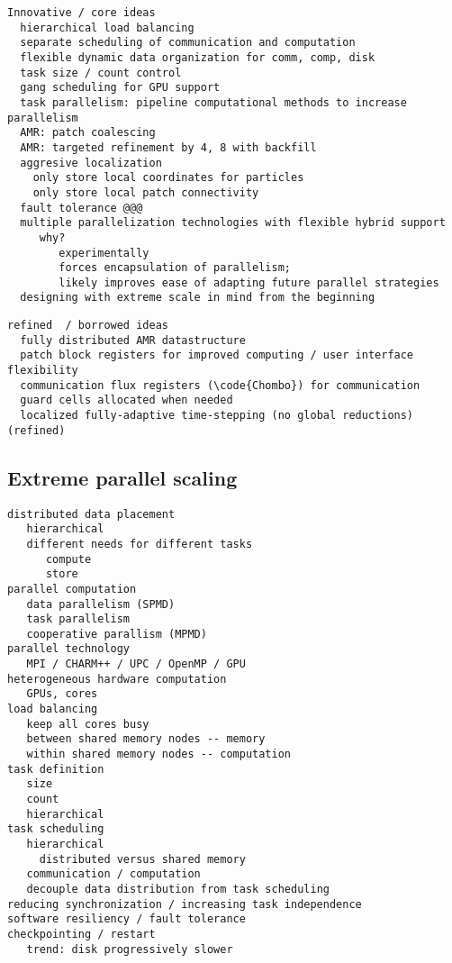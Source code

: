 \documentclass[14pt,letter]{article}
\begin{document}
\begin{verbatim}
Innovative / core ideas
  hierarchical load balancing
  separate scheduling of communication and computation
  flexible dynamic data organization for comm, comp, disk
  task size / count control
  gang scheduling for GPU support
  task parallelism: pipeline computational methods to increase parallelism
  AMR: patch coalescing
  AMR: targeted refinement by 4, 8 with backfill
  aggresive localization
    only store local coordinates for particles
    only store local patch connectivity
  fault tolerance @@@
  multiple parallelization technologies with flexible hybrid support
     why?  
        experimentally 
        forces encapsulation of parallelism; 
        likely improves ease of adapting future parallel strategies
  designing with extreme scale in mind from the beginning
\end{verbatim}

\begin{verbatim}
refined  / borrowed ideas
  fully distributed AMR datastructure
  patch block registers for improved computing / user interface flexibility
  communication flux registers (\code{Chombo}) for communication
  guard cells allocated when needed
  localized fully-adaptive time-stepping (no global reductions) (refined)
\end{verbatim}




\subsection{Extreme parallel scaling} \label{ss:parallel-scaling}

\begin{verbatim}
distributed data placement
   hierarchical
   different needs for different tasks
      compute
      store
parallel computation
   data parallelism (SPMD)
   task parallelism
   cooperative parallism (MPMD)
parallel technology
   MPI / CHARM++ / UPC / OpenMP / GPU
heterogeneous hardware computation
   GPUs, cores
load balancing
   keep all cores busy
   between shared memory nodes -- memory
   within shared memory nodes -- computation
task definition
   size
   count
   hierarchical
task scheduling
   hierarchical
     distributed versus shared memory
   communication / computation
   decouple data distribution from task scheduling
reducing synchronization / increasing task independence
software resiliency / fault tolerance
checkpointing / restart
   trend: disk progressively slower
\end{verbatim}
\end{document}
